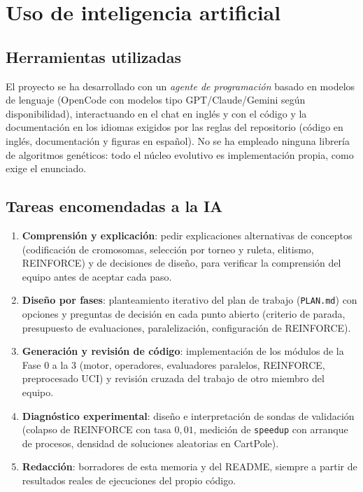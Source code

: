 \section{Uso de inteligencia artificial}

\subsection{Herramientas utilizadas}

El proyecto se ha desarrollado con un \emph{agente de programación} basado en modelos de lenguaje (OpenCode con modelos tipo GPT/Claude/Gemini según disponibilidad), interactuando en el chat en inglés y con el código y la documentación en los idiomas exigidos por las reglas del repositorio (código en inglés, documentación y figuras en español). No se ha empleado ninguna librería de algoritmos genéticos: todo el núcleo evolutivo es implementación propia, como exige el enunciado.

\subsection{Tareas encomendadas a la IA}

\begin{enumerate}
  \item \textbf{Comprensión y explicación}: pedir explicaciones alternativas de conceptos (codificación de cromosomas, selección por torneo y ruleta, elitismo, REINFORCE) y de decisiones de diseño, para verificar la comprensión del equipo antes de aceptar cada paso.
  \item \textbf{Diseño por fases}: planteamiento iterativo del plan de trabajo (\texttt{PLAN.md}) con opciones y preguntas de decisión en cada punto abierto (criterio de parada, presupuesto de evaluaciones, paralelización, configuración de REINFORCE).
  \item \textbf{Generación y revisión de código}: implementación de los módulos de la Fase 0 a la 3 (motor, operadores, evaluadores paralelos, REINFORCE, preprocesado UCI) y revisión cruzada del trabajo de otro miembro del equipo.
  \item \textbf{Diagnóstico experimental}: diseño e interpretación de sondas de validación (colapso de REINFORCE con tasa $0{,}01$, medición de \texttt{speedup} con arranque de procesos, densidad de soluciones aleatorias en CartPole).
  \item \textbf{Redacción}: borradores de esta memoria y del README, siempre a partir de resultados reales de ejecuciones del propio código.
\end{enumerate}

